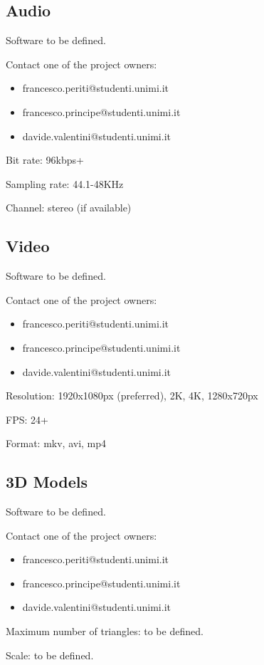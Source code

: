 \documentclass[12pt]{article}
\begin{document}
\subsection{Audio}

Software to be defined.

Contact one of the project owners:
\begin{itemize}
	\item francesco.periti@studenti.unimi.it
	\item francesco.principe@studenti.unimi.it
	\item davide.valentini@studenti.unimi.it
\end{itemize}

Bit rate: 96kbps+

Sampling rate: 44.1-48KHz

Channel: stereo (if available)

\subsection{Video}
Software to be defined.

Contact one of the project owners:
\begin{itemize}
	\item francesco.periti@studenti.unimi.it
	\item francesco.principe@studenti.unimi.it
	\item davide.valentini@studenti.unimi.it
\end{itemize}

Resolution: 1920x1080px (preferred), 2K, 4K, 1280x720px

FPS: 24+

Format: mkv, avi, mp4

\subsection{3D Models}
Software to be defined.

Contact one of the project owners:
\begin{itemize}
	\item francesco.periti@studenti.unimi.it
	\item francesco.principe@studenti.unimi.it
	\item davide.valentini@studenti.unimi.it
\end{itemize}

Maximum number of triangles: to be defined.

Scale: to be defined.
\end{document}
